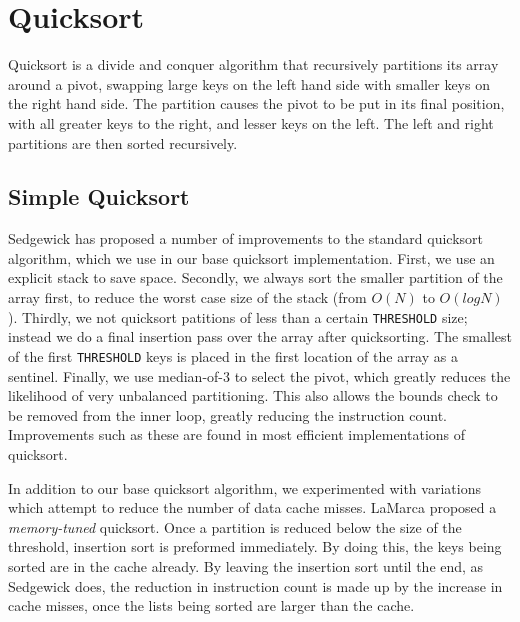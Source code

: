 \documentclass[acmtocl]{acmtrans2m}
\begin{document}
\section{Quicksort}
Quicksort is a divide and conquer algorithm that recursively
partitions its array around a pivot, swapping large keys on the left
hand side with smaller keys on the right hand side. The partition
causes the pivot to be put in its final position, with all greater
keys to the right, and lesser keys on the left. The left and right
partitions are then sorted recursively.

\subsection{Simple Quicksort}
Sedgewick \cite{} has proposed a number of improvements to the
standard quicksort algorithm, which we use in our base quicksort
implementation. First, we use an explicit stack to save space.
Secondly, we always sort the smaller partition of the array first, to
reduce the worst case size of the stack (from $O(N)$ to
$O(logN)$). Thirdly, we not quicksort patitions of less than a certain
\texttt{THRESHOLD} size; instead we do a final insertion pass over the
array after quicksorting. The smallest of the first \texttt{THRESHOLD}
keys is placed in the first location of the array as a
sentinel. Finally, we use median-of-3 to select the pivot, which
greatly reduces the likelihood of very unbalanced partitioning. This
also allows the bounds check to be removed from the inner loop,
greatly reducing the instruction count. Improvements such as these are
found in most efficient implementations of quicksort.

In addition to our base quicksort algorithm, we experimented with
variations which attempt to reduce the number of data cache
misses. LaMarca \cite{} proposed a \textit{memory-tuned} quicksort.
Once a partition is reduced below the size of the threshold, insertion
sort is preformed immediately. By doing this, the keys being sorted
are in the cache already. By leaving the insertion sort until the end,
as Sedgewick does, the reduction in instruction count is made up by
the increase in cache misses, once the lists being sorted are larger
than the cache.
\end{document}
